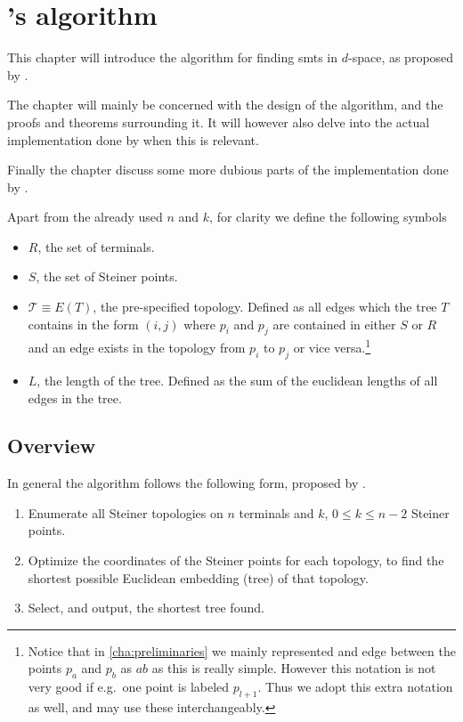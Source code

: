 { \abnormalparskip{0pt}
\chapter{\citeauthor{smith1992}'s algorithm}
\label{cha:algorithm} }


This chapter will introduce the algorithm for finding \acp{smt} in
$d$-space, as proposed by \textcite{smith1992}.

The chapter will mainly be concerned with the design of the algorithm, and the
proofs and theorems surrounding it. It will however also delve into the actual
implementation done by \citeauthor{smith1992} when this is relevant.

Finally the chapter discuss some more dubious parts of the implementation done
by \citeauthor{smith1992}.

Apart from the already used $n$ and $k$, for clarity we define the following symbols
%
\begin{itemize}
\item $R$, the set of terminals.
\item $S$, the set of Steiner points.
\item $\mathcal{T} \equiv E(T)$, the pre-specified topology. Defined as all
  edges which the tree $T$ contains in the form $(i, j)$ where $p_i$ and
  $p_j$ are contained in either $S$ or $R$ and an edge exists in the
  topology from $p_i$ to $p_j$ or vice versa.\footnote{Notice that in
    \cref{cha:preliminaries} we mainly represented and edge between the points
    $p_a$ and $p_b$ as $ab$ as this is really simple. However this notation is not
    very good if e.g.\ one point is labeled $p_{l+1}$. Thus we adopt this extra
    notation as well, and may use these interchangeably.}
\item $L$, the length of the tree. Defined as the sum of the euclidean lengths
of all edges in the tree.
\end{itemize}

\section{Overview}
\label{sec:overview}

In general the algorithm follows the following form, proposed by \textcite{gilbert1968}.

\begin{enumerate}
\item Enumerate all Steiner topologies on $n$ terminals and $k$, $0 \le k \le
n-2$ Steiner points.
\item Optimize the coordinates of the Steiner points for each topology, to find
the shortest possible Euclidean embedding (tree) of that topology.
\item Select, and output, the shortest tree found.
\end{enumerate}

